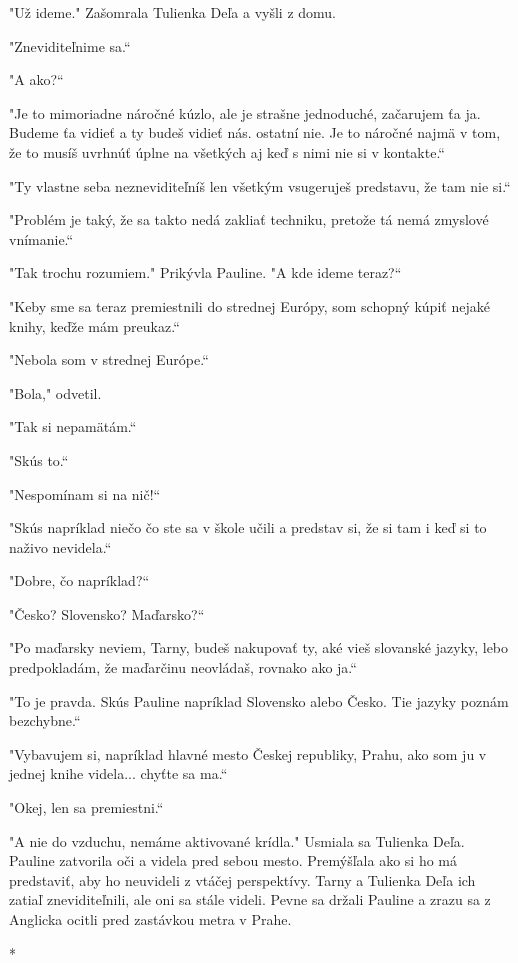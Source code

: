 \documentclass{book}
\begin{document}
"$ $Už ideme."$ $ Zašomrala Tulienka Deľa a vyšli z domu.

"$ $Zneviditeľnime sa.“

"$ $A ako?“

"$ $Je to mimoriadne náročné kúzlo, ale je strašne jednoduché, začarujem ťa ja. Budeme ťa vidieť a ty budeš vidieť nás. ostatní nie. Je to náročné najmä v tom, že to musíš uvrhnúť úplne na všetkých aj keď s nimi nie si v kontakte.“

"$ $Ty vlastne seba nezneviditeľníš len všetkým vsugeruješ predstavu, že tam nie si.“

"$ $Problém je taký, že sa takto nedá zakliať techniku, pretože tá nemá zmyslové vnímanie.“

"$ $Tak trochu rozumiem."$ $ Prikývla Pauline. "$ $A kde ideme teraz?“

"$ $Keby sme sa teraz premiestnili do strednej Európy, som schopný kúpiť nejaké knihy, keďže mám preukaz.“

"$ $Nebola som v strednej Európe.“

"$ $Bola,"$ $ odvetil.

"$ $Tak si nepamätám.“

"$ $Skús to.“

"$ $Nespomínam si na nič!“

"$ $Skús napríklad niečo čo ste sa v škole učili a predstav si, že si tam i keď si to naživo nevidela.“

"$ $Dobre, čo napríklad?“

"$ $Česko? Slovensko? Maďarsko?“

"$ $Po maďarsky neviem, Tarny, budeš nakupovať ty, aké vieš slovanské jazyky, lebo predpokladám, že maďarčinu neovládaš, rovnako ako ja.“

"$ $To je pravda. Skús Pauline napríklad Slovensko alebo Česko. Tie jazyky poznám bezchybne.“

"$ $Vybavujem si, napríklad hlavné mesto Českej republiky, Prahu, ako som ju v jednej knihe videla... chyťte sa ma.“

"$ $Okej, len sa premiestni.“

"$ $A nie do vzduchu, nemáme aktivované krídla."$ $ Usmiala sa Tulienka Deľa. Pauline zatvorila oči a videla pred sebou mesto. Premýšľala ako si ho má predstaviť, aby ho neuvideli z vtáčej perspektívy. Tarny a Tulienka Deľa ich zatiaľ zneviditeľnili, ale oni sa stále videli. Pevne sa držali Pauline a zrazu sa z Anglicka ocitli pred zastávkou metra v Prahe.

\begin{center}
*
\end{center}
\end{document}
